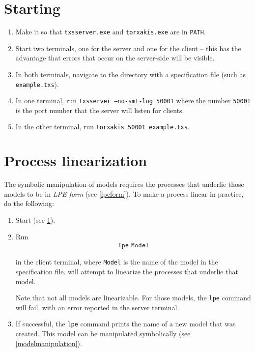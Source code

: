 \section{Starting \txs{}} \label{starttxs}

\begin{enumerate}
\item Make it so that \texttt{txsserver.exe} and \texttt{torxakis.exe} are in \texttt{PATH}.
\item Start two terminals, one for the \txs{} server and one for the \txs{} client -- this has the advantage that errors that occur on the server-side will be visible.
\item In both terminals, navigate to the directory with a \txs{} specification file (such as \texttt{example.txs}).
\item In one terminal, run \texttt{txsserver --no-smt-log 50001} where the number \texttt{50001} is the port number that the \txs{} server will listen for clients.
\item In the other terminal, run \texttt{torxakis 50001 example.txs}.
\end{enumerate}

\section{Process linearization} \label{processlinearization}

The symbolic manipulation of \txs{} models requires the processes that underlie those models to be in \emph{LPE form} (see \ref{lpeform}).
To make a \txs{} process linear in practice, do the following:

\begin{enumerate}
\item Start \txs{} (see \ref{starttxs}).
\item Run
\begin{align*}
\texttt{lpe Model}
\end{align*}

in the client terminal, where \texttt{Model} is the name of the model in the \txs{} specification file.
\txs{} will attempt to linearize the processes that underlie that model.

Note that not all \txs{} models are linearizable.
For those models, the \texttt{lpe} command will fail, with an error reported in the server terminal.
\item If successful, the \texttt{lpe} command prints the name of a new \txs{} model that was created.
This model can be manipulated symbolically (see \ref{modelmanipulation}).
\end{enumerate}

